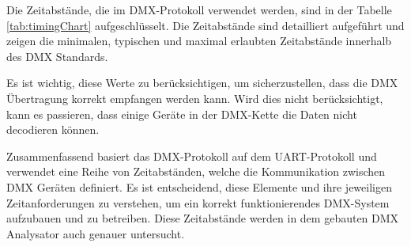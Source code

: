 Die Zeitabstände, die im DMX-Protokoll verwendet werden, sind in der Tabelle \ref{tab:timingChart} aufgeschlüsselt. Die Zeitabstände sind detailliert aufgeführt und zeigen die minimalen, typischen und maximal erlaubten Zeitabstände innerhalb des DMX Standards.

\begin{table}[H]
	\centering
	\caption{Zeitdiagramm \cite[S.18]{DMX512-Protocol-Standard}}
	\label{tab:timingChart}
\end{table}

Es ist wichtig, diese Werte zu berücksichtigen, um sicherzustellen, dass die DMX Übertragung korrekt empfangen werden kann. Wird dies nicht berücksichtigt, kann es passieren, dass einige Geräte in der DMX-Kette die Daten nicht decodieren können.


Zusammenfassend basiert das DMX-Protokoll auf dem UART-Protokoll und verwendet eine Reihe von Zeitabständen, welche die Kommunikation zwischen DMX Geräten definiert. Es ist entscheidend, diese Elemente und ihre jeweiligen Zeitanforderungen zu verstehen, um ein korrekt funktionierendes DMX-System aufzubauen und zu betreiben. Diese Zeitabstände werden in dem gebauten DMX Analysator auch genauer untersucht.


